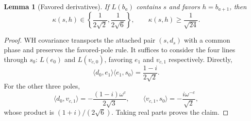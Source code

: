 \documentclass[11pt,a4paper]{article}
\newtheorem{lemma}[theorem]{Lemma}
\theoremstyle{remark}
\numberwithin{equation}{section}
\newcommand{\ip}[2]{\langle #1,#2\rangle}
\begin{document}
\begin{lemma}[Favored derivatives]\label{lem:derivatives}
If $L(b_a)$ contains $s$ and favors $h=b_{a+1}$, then
\[
 \kappa(s,h)\in\left\{\frac1{2\sqrt2},\frac1{2\sqrt6}\right\},
 \qquad \kappa(s,h)\ge\frac1{\sqrt{24}}.
\]
\end{lemma}
\begin{proof}
WH covariance transports the attached pair $(s,d_s)$ with a common phase and preserves the favored-pole rule. It suffices to consider the four lines through $s_0$: $L(e_0)$ and $L(v_{c,0})$, favoring $e_1$ and $v_{c,1}$ respectively. Directly,
\[
 \ip{d_0}{e_1}\ip{e_1}{s_0}=\frac{1-i}{2\sqrt2}.
\]
For the other three poles,
\[
 \ip{d_0}{v_{c,1}}=-\frac{(1-i)\omega^c}{2\sqrt3},\qquad
 \ip{v_{c,1}}{s_0}=-\frac{i\omega^{-c}}{\sqrt2},
\]
whose product is $(1+i)/(2\sqrt6)$. Taking real parts proves the claim.
\end{proof}
\end{document}
